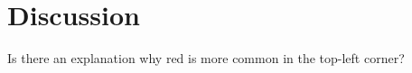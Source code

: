 \section{Discussion} \label{conclusion}

Is there an explanation why red is more common in the top-left corner?

